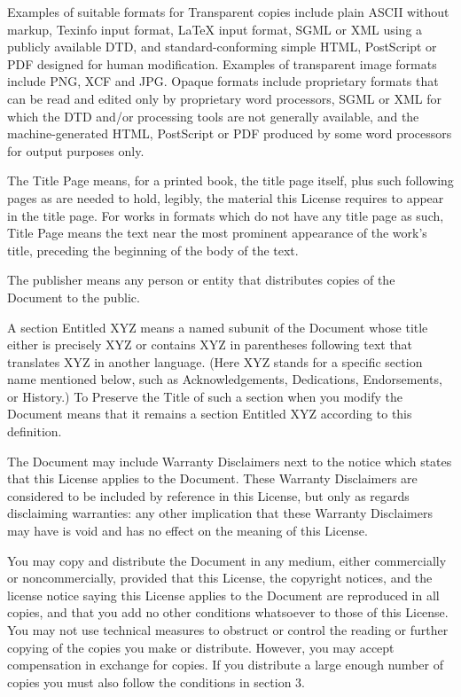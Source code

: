 \begin{BookLicense}
Examples of suitable formats for Transparent copies include plain ASCII without markup, Texinfo input format, LaTeX input format, SGML or XML using a publicly available DTD, and standard-conforming simple HTML, PostScript or PDF designed for human modification. Examples of transparent image formats include PNG, XCF and JPG. Opaque formats include proprietary formats that can be read and edited only by proprietary word processors, SGML or XML for which the DTD and/or processing tools are not generally available, and the machine-generated HTML, PostScript or PDF produced by some word processors for output purposes only.

The \BookQuoteChar{}Title Page\BookQuoteChar{} means, for a printed book, the title page itself, plus such following pages as are needed to hold, legibly, the material this License requires to appear in the title page. For works in formats which do not have any title page as such, \BookQuoteChar{}Title Page\BookQuoteChar{} means the text near the most prominent appearance of the work's title, preceding the beginning of the body of the text.

The \BookQuoteChar{}publisher\BookQuoteChar{} means any person or entity that distributes copies of the Document to the public.

A section \BookQuoteChar{}Entitled XYZ\BookQuoteChar{} means a named subunit of the Document whose title either is precisely XYZ or contains XYZ in parentheses following text that translates XYZ in another language. (Here XYZ stands for a specific section name mentioned below, such as \BookQuoteChar{}Acknowledgements\BookQuoteChar{}, \BookQuoteChar{}Dedications\BookQuoteChar{}, \BookQuoteChar{}Endorsements\BookQuoteChar{}, or \BookQuoteChar{}History\BookQuoteChar{}.) To \BookQuoteChar{}Preserve the Title\BookQuoteChar{} of such a section when you modify the Document means that it remains a section \BookQuoteChar{}Entitled XYZ\BookQuoteChar{} according to this definition.

The Document may include Warranty Disclaimers next to the notice which states that this License applies to the Document. These Warranty Disclaimers are considered to be included by reference in this License, but only as regards disclaiming warranties: any other implication that these Warranty Disclaimers may have is void and has no effect on the meaning of this License.

You may copy and distribute the Document in any medium, either commercially or noncommercially, provided that this License, the copyright notices, and the license notice saying this License applies to the Document are reproduced in all copies, and that you add no other conditions whatsoever to those of this License. You may not use technical measures to obstruct or control the reading or further copying of the copies you make or distribute. However, you may accept compensation in exchange for copies. If you distribute a large enough number of copies you must also follow the conditions in section 3.


\end{BookLicense}
